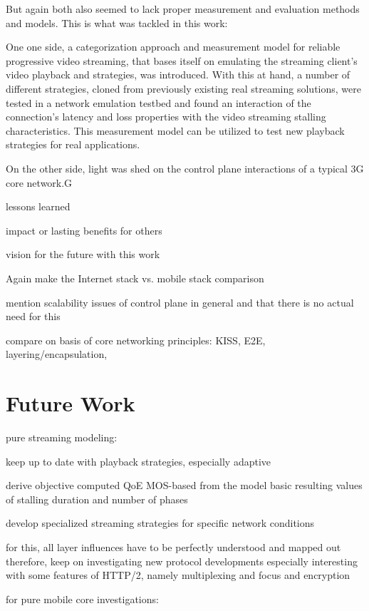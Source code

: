 But again both also seemed to lack proper measurement and evaluation methods and models. This is what was tackled in this work: 

One one side, a categorization approach and measurement model for reliable progressive video streaming, that bases itself on emulating the streaming client's video playback and strategies, was introduced. With this at hand, a number of different strategies, cloned from previously existing real streaming solutions, were tested in a network emulation testbed and found an interaction of the connection's latency and loss properties with the video streaming stalling characteristics. This measurement model can be utilized to test new playback strategies for real applications.

On the other side, light was shed on the control plane interactions of a typical \gls{3G} core network.G

lessons learned

impact or lasting benefits for others

vision for the future with this work

Again make the Internet stack vs. mobile stack comparison

mention scalability issues of control plane in general and that there is no actual need for this

compare on basis of core networking principles: KISS, E2E, layering/encapsulation, 





\section{Future Work}

pure streaming modeling:

	keep up to date with playback strategies, especially adaptive

	derive objective computed \gls{QoE} \gls{MOS}-based from the model basic resulting values of stalling duration and number of phases

	develop specialized streaming strategies for specific network conditions

	for this, all layer influences have to be perfectly understood and mapped out
	therefore, keep on investigating new protocol developments
	especially interesting with some features of HTTP/2, namely multiplexing and focus and encryption


for pure mobile core investigations:

